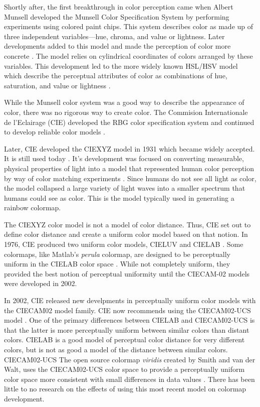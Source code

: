 \documentclass[journal,12pt]{IEEEtran}
\begin{document}
Shortly after, the first breakthrough in color perception came when
Albert Munsell developed the Munsell Color Specification System
by performing experiments using colored paint chips.
This system describes color as made up of three independent variables---hue, chroma, and value or lightness.
Later developments added to this model and made the perception of color 
more concrete \cite{colormapping}. The model relies on cylindrical coordinates
of colors arranged by these variables. This development led to the more
widely known HSL/HSV model which describe the perceptual attributes of color as combinations of hue,
saturation, and value or lightness \cite{colorimetry}.

While the Munsell color system was a good way to describe the appearance of color,
there was no rigorous way to create color. The Commision
Internationale de l'Eclairage (CIE) developed the RBG color specification system
and continued to develop reliable color models \cite{colorimetry}.

Later, CIE developed the CIEXYZ model in 1931
which became widely accepted. It is still used today \cite{viridis}. It's development was 
focused on converting measurable, physical properties of light into a model
that represented human color perception by way of color matching experiments 
\cite{colorimetry}.
Since humans do not see all light 
as color, the model collapsed a large variety of light waves into a smaller 
spectrum that humans could see as color. This is the model typically used in 
generating a rainbow colormap.

The CIEXYZ color model is not a model of color distance. Thus, CIE set out to
define color distance and create a uniform color model based on that notion.
In 1976, CIE produced two uniform color models, CIELUV and CIELAB \cite{colorimetry}. Some colormaps,
like Matlab's \textit{perula} colormap, are designed to be perceptually
uniform in the CIELAB color space \cite{viridis}. While not 
completely uniform, they provided the best notion of perceptual uniformity until
the CIECAM-02 models were developed in 2002.


In 2002, CIE released new develpments in perceptually uniform color models with
the CIECAM02 model family. CIE now recommends using the CIECAM02-UCS model 
\cite{ciecam02}.
One of the primary differences between CIELAB and CIECAM02-UCS is that the latter
is more perceptually uniform between similar colors than distant colors. CIELAB
is a good model of perceptual color distance for very different colors, but 
is not as good a model of the distance between similar colors.
CIECAM02-UCS The open source colormap \textit{viridis} created by Smith and van der Walt, uses
the CIECAM02-UCS color space to provide a perceptually uniform color space more
consistent with small differences in data values \cite{viridis}. There has been
little to no research on the effects of using this most recent model on colormap
development.
\end{document}
